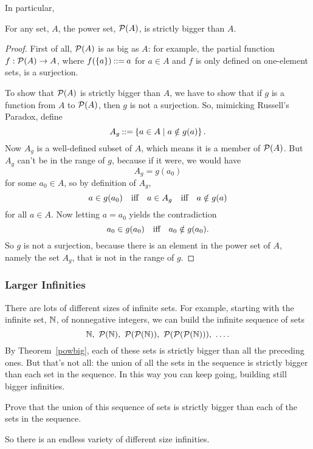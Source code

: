 In particular,
\begin{theorem}\label{powbig}
For any set, $A$, the power set, $\mathcal{P}(A)$, is strictly bigger than $A$.
\end{theorem}
\begin{proof}
  First of all, $\mathcal{P}(A)$ is as big as $A$: for example, the partial
  function $f:\mathcal{P}(A) \to A$, where $f(\left\{a\right\}) \mathbin{::=} a$ for $a \in A$
  and $f$ is only defined on one-element sets, is a surjection.

  To show that $\mathcal{P}(A)$ is strictly bigger than $A$, we have to show
  that if $g$ is a function from $A$ to $\mathcal{P}(A)$, then $g$ is not a
  surjection.  So, mimicking Russell's Paradox, define
  \[
  A_g \mathbin{::=} \left\{a \in A \mid a \notin g(a)\right\}.
  \]
  Now $A_g$ is a well-defined subset of $A$, which means it is a member of
  $\mathcal{P}(A)$.  But $A_g$ can't be in the range of $g$, because if it
  were, we would have
\[
A_g = g(a_0)
\]
for some $a_0 \in A$, so by definition of $A_g$,
\[
a \in g(a_0) \quad \text{iff} \quad a \in A_g \quad \text{iff} \quad a \notin g(a)
\]
for all $a \in A$.  Now letting $a = a_0$ yields the contradiction
\[
a_0 \in g(a_0) \quad \text{iff} \quad a_0 \notin g(a_0).
\]
So $g$ is not a surjection, because there is an element in the power set
of $A$, namely the set $A_g$, that is not in the range of $g$.
\end{proof}

\subsubsection{Larger Infinities}

There are lots of different sizes of infinite sets.  For example, starting
with the infinite set, $\mathbb{N}$, of nonnegative integers, we can build
the infinite sequence of sets
\[
\naturals,\ \power(\naturals),\ \power(\power(\naturals)),\
\power(\power(\power(\naturals))),\ \dots.
\]
By Theorem~\ref{powbig}, each of these sets is strictly bigger than all
the preceding ones.  But that's not all: the union of all the sets in the
sequence is strictly bigger than each set in the sequence.  In this way
you can keep going, building still bigger infinities.

\begin{notesproblem}{}
  Prove that the union of this sequence of sets is strictly bigger than
  each of the sets in the sequence.
\end{notesproblem}

So there is an endless variety of different size infinities.

